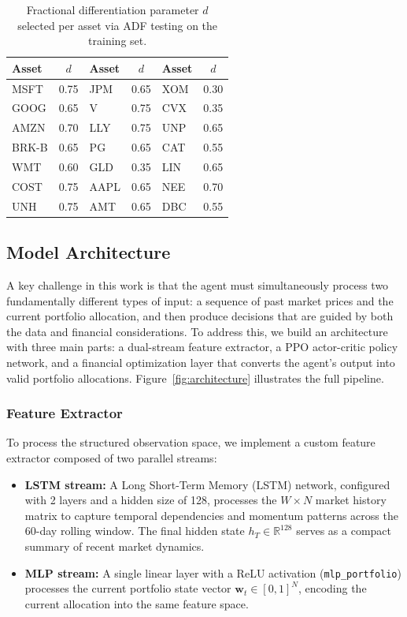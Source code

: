 \documentclass[final]{article}
\begin{document}
\begin{table}[h!]
    \centering
    \caption{Fractional differentiation parameter $d$ selected per asset via ADF
    testing on the training set.}
    \label{tab:fracdiff}
    \begin{tabular}{lc|lc|lc}
        \toprule
        \textbf{Asset} & $d$ & \textbf{Asset} & $d$ & \textbf{Asset} & $d$ \\
        \midrule
        MSFT   & 0.75 & JPM  & 0.65 & XOM & 0.30 \\
        GOOG   & 0.65 & V    & 0.75 & CVX & 0.35 \\
        AMZN   & 0.70 & LLY  & 0.75 & UNP & 0.65 \\
        BRK-B  & 0.65 & PG   & 0.65 & CAT & 0.55 \\
        WMT    & 0.60 & GLD  & 0.35 & LIN & 0.65 \\
        COST   & 0.75 & AAPL & 0.65 & NEE & 0.70 \\
        UNH    & 0.75 & AMT  & 0.65 & DBC & 0.55 \\
        \bottomrule
    \end{tabular}
\end{table}

\subsection{Model Architecture}
\label{sec:architecture}
A key challenge in this work is that the agent must simultaneously process two fundamentally different types of
input: a sequence of past market prices and the current portfolio allocation, and then produce decisions that are
guided by both the data and financial considerations. To address this, we build an architecture with three main parts:
a dual-stream feature extractor, a PPO actor-critic policy network, and a financial optimization layer that converts
the agent’s output into valid portfolio allocations. Figure~\ref{fig:architecture} illustrates the full pipeline.

\subsubsection*{Feature Extractor}
To process the structured observation space, we implement a custom feature extractor composed of two parallel streams:

\begin{itemize}
    \item \textbf{LSTM stream:} A Long Short-Term Memory (LSTM) network, configured
    with 2 layers and a hidden size of 128, processes the
    $W \times N$ market history matrix to capture temporal dependencies and momentum
    patterns across the 60-day rolling window. The final hidden state
    $h_T \in \mathbb{R}^{128}$ serves as a compact summary of recent market dynamics.

    \item \textbf{MLP stream:} A single linear layer with a ReLU activation
    (\texttt{mlp\_portfolio}) processes the current portfolio state vector
    $\mathbf{w}_t \in [0,1]^N$, encoding the current allocation into the same
    feature space.
\end{itemize}
\end{document}
